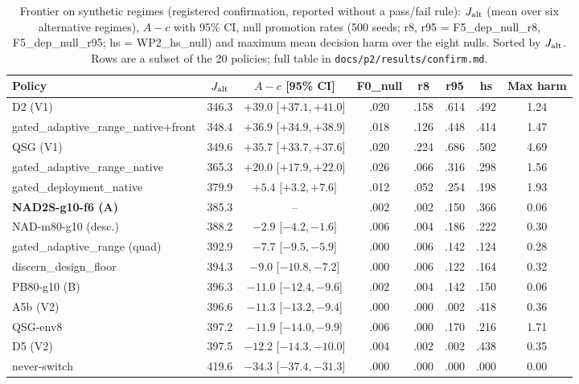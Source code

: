 \begin{table}[t]
\caption{Frontier on synthetic regimes (registered confirmation, reported without a pass/fail rule): $J_{\rm alt}$ (mean over six alternative regimes), $A-c$ with 95\% CI, null promotion rates (500 seeds; r8, r95 = F5\_dep\_null\_r8, F5\_dep\_null\_r95; hs = WP2\_hs\_null) and maximum mean decision harm over the eight nulls. Sorted by $J_{\rm alt}$. Rows are a subset of the 20 policies; full table in \texttt{docs/p2/results/confirm.md}.}\label{tab:frontier}
\centering\small
\begin{tabular}{@{}lccccccc@{}}
\toprule
Policy & $J_{\rm alt}$ & $A-c$ [95\% CI] & F0\_null & r8 & r95 & hs & Max harm \\
\midrule
D2 (V1) & 346.3 & $+39.0$ [$+37.1,+41.0$] & .020 & .158 & .614 & .492 & 1.24 \\
gated\_adaptive\_range\_native+front & 348.4 & $+36.9$ [$+34.9,+38.9$] & .018 & .126 & .448 & .414 & 1.47 \\
QSG (V1) & 349.6 & $+35.7$ [$+33.7,+37.6$] & .020 & .224 & .686 & .502 & 4.69 \\
gated\_adaptive\_range\_native & 365.3 & $+20.0$ [$+17.9,+22.0$] & .026 & .066 & .316 & .298 & 1.56 \\
gated\_deployment\_native & 379.9 & $+5.4$ [$+3.2,+7.6$] & .012 & .052 & .254 & .198 & 1.93 \\
\textbf{NAD2S-g10-f6 (A)} & 385.3 & -- & .002 & .002 & .150 & .366 & 0.06 \\
NAD-m80-g10 (desc.) & 388.2 & $-2.9$ [$-4.2,-1.6$] & .006 & .004 & .186 & .222 & 0.30 \\
gated\_adaptive\_range (quad) & 392.9 & $-7.7$ [$-9.5,-5.9$] & .000 & .006 & .142 & .124 & 0.28 \\
discern\_design\_floor & 394.3 & $-9.0$ [$-10.8,-7.2$] & .000 & .006 & .122 & .164 & 0.32 \\
PB80-g10 (B) & 396.3 & $-11.0$ [$-12.4,-9.6$] & .002 & .004 & .142 & .150 & 0.06 \\
A5b (V2) & 396.6 & $-11.3$ [$-13.2,-9.4$] & .000 & .000 & .002 & .418 & 0.36 \\
QSG-env8 & 397.2 & $-11.9$ [$-14.0,-9.9$] & .006 & .000 & .170 & .216 & 1.71 \\
D5 (V2) & 397.5 & $-12.2$ [$-14.3,-10.0$] & .004 & .002 & .002 & .438 & 0.35 \\
never-switch & 419.6 & $-34.3$ [$-37.4,-31.3$] & .000 & .000 & .000 & .000 & 0.00 \\
\bottomrule
\end{tabular}
\end{table}

